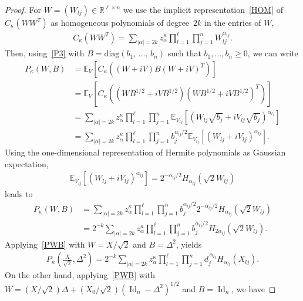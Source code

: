 \documentclass[AHL,Unicode,longabstracts,published]{cedram}
\DeclareMathOperator{\Id}{Id}
\newcommand{\diag}{\mathrm{diag}}
\newcommand{\R}{\mathbb{R}}
\newcommand{\EX}[2]{\mathbb{E}_{#1}\left[#2\right]}
\begin{document}
\begin{proof}
For $W=(W_{lj}) \in \R^{\ell\times n}$ we use the implicit representation~\eqref{HOM} of $C_{\kappa}(WW^T)$ as homogeneous polynomials of degree~$2k$ in the entries of $W$,
\begin{gather*}
C_{\kappa}\left(WW^T\right) = \sum_{|\alpha|=2k} z_{\alpha}^{\kappa} \prod_{l=1}^{\ell}\prod_{j=1}^{n} W_{lj}^{\alpha_{ij}}.
\end{gather*}
Then, using~\eqref{P3} with $B=\diag(b_1,\,\ldots,\,b_n)$ such that $b_1,\ldots,b_n\geq0$, we can write
\begin{align*}
P_{\kappa}(W,B) &= \EX{V}{C_{\kappa}\left((W+iV)B(W+iV)^T\right)} \\
&= \EX{V}{C_{\kappa}\left(\left(WB^{1/2}+iVB^{1/2}\right)\left(WB^{1/2}+iVB^{1/2}\right)^T\right)} \\
&= \sum_{|\alpha|=2k} z_{\alpha}^{\kappa} \prod_{l=1}^{\ell}\prod_{j=1}^{n} \EX{V_{lj}}{\left(W_{lj}\sqrt{b_{j}}+iV_{lj}\sqrt{b_{j}}\right)^{\alpha_{lj}}} \\
&= \sum_{|\alpha|=2k} z_{\alpha}^{\kappa} \prod_{l=1}^{\ell}\prod_{j=1}^{n} b_{j}^{\alpha_{lj}/2}\EX{V_{lj}}{\left(W_{lj}+iV_{lj}\right)^{\alpha_{lj}}}.
\end{align*}
Using the one-dimensional representation of Hermite polynomials as Gaussian expectation,
\begin{gather*}
\EX{V_{lj}}{\left(W_{lj}+iV_{lj}\right)^{\alpha_{lj}}} = 2^{-\alpha_{lj}/2}H_{\alpha_{lj}}\left(\sqrt{2}W_{lj}\right)
\end{gather*}
leads to
\begin{equation}\label{PWB}
\begin{split}
P_{\kappa}(W,B) &= \sum_{|\alpha|=2k} z_{\alpha}^{\kappa} \prod_{l=1}^{\ell}\prod_{j=1}^{n} b_{j}^{\alpha_{lj}/2} 2^{-\alpha_{lj}/2}H_{\alpha_{lj}}\left(\sqrt{2}W_{lj}\right)\\
&= 2^{-k}\sum_{|\alpha|=2k} z_{\alpha}^{\kappa} \prod_{l=1}^{\ell}\prod_{j=1}^{n} b_{j}^{\alpha_{lj}/2} H_{2\alpha_{lj}}\left(\sqrt{2}W_{lj}\right).
\end{split}
\end{equation}
Applying~\eqref{PWB} with $W=X/\sqrt{2}$ and $B=\Delta^2$, yields
\begin{gather}\label{Eq1}
P_{\kappa}\left(\frac{X}{\sqrt{2}},\Delta^2\right) = 2^{-k}\sum_{|\alpha|=2k} z_{\alpha}^{\kappa} \prod_{l=1}^{\ell}\prod_{j=1}^{n} d_j^{\,\alpha_{lj}} H_{\alpha_{lj}}(X_{lj}).
\end{gather}
On the other hand, applying~\eqref{PWB} with $W=(X/\sqrt{2})\Delta+(X_0/\sqrt{2})(\Id_n-\Delta^2)^{1/2}$ and $B=\Id_n$, we have

\end{proof}
\end{document}
